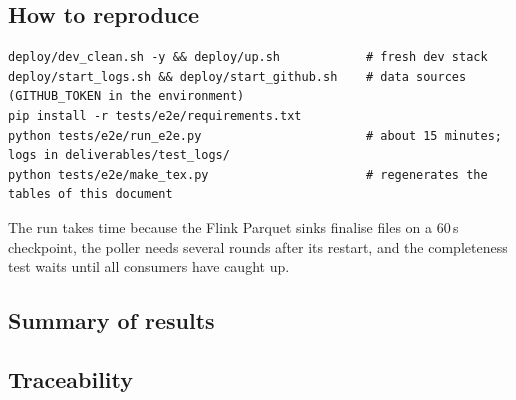 \documentclass[11pt,a4paper]{article}
\begin{document}
\subsection{How to reproduce}

\begin{lstlisting}
deploy/dev_clean.sh -y && deploy/up.sh            # fresh dev stack
deploy/start_logs.sh && deploy/start_github.sh    # data sources (GITHUB_TOKEN in the environment)
pip install -r tests/e2e/requirements.txt
python tests/e2e/run_e2e.py                       # about 15 minutes; logs in deliverables/test_logs/
python tests/e2e/make_tex.py                      # regenerates the tables of this document
\end{lstlisting}

The run takes time because the Flink Parquet sinks finalise files on a 60\,s checkpoint, the poller needs several rounds after its restart, and
the completeness test waits until all consumers have caught up.

\subsection{Summary of results}

\begin{table}[H]
\centering
\caption{Results by group.}

\end{table}

\subsection{Traceability}
\end{document}
